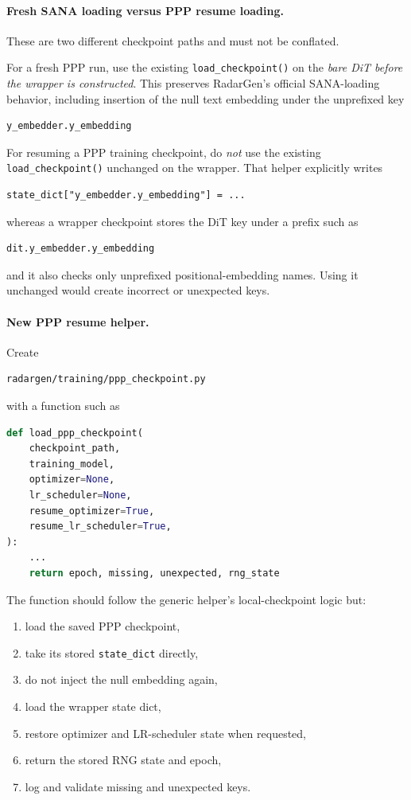 \documentclass[11pt,a4paper]{article}
\begin{document}
\paragraph{Fresh SANA loading versus PPP resume loading.}
These are two different checkpoint paths and must not be conflated.

For a fresh PPP run, use the existing \texttt{load\_checkpoint()} on the \emph{bare DiT before the wrapper is constructed}. This preserves RadarGen's official SANA-loading behavior, including insertion of the null text embedding under the unprefixed key
\begin{lstlisting}
y_embedder.y_embedding
\end{lstlisting}

For resuming a PPP training checkpoint, do \emph{not} use the existing \texttt{load\_checkpoint()} unchanged on the wrapper. That helper explicitly writes
\begin{lstlisting}
state_dict["y_embedder.y_embedding"] = ...
\end{lstlisting}
whereas a wrapper checkpoint stores the DiT key under a prefix such as
\begin{lstlisting}
dit.y_embedder.y_embedding
\end{lstlisting}
and it also checks only unprefixed positional-embedding names. Using it unchanged would create incorrect or unexpected keys.

\paragraph{New PPP resume helper.}
Create
\begin{lstlisting}
radargen/training/ppp_checkpoint.py
\end{lstlisting}
with a function such as
\begin{lstlisting}[language=Python]
def load_ppp_checkpoint(
    checkpoint_path,
    training_model,
    optimizer=None,
    lr_scheduler=None,
    resume_optimizer=True,
    resume_lr_scheduler=True,
):
    ...
    return epoch, missing, unexpected, rng_state
\end{lstlisting}

The function should follow the generic helper's local-checkpoint logic but:
\begin{enumerate}[label=\arabic*.]
    \item load the saved PPP checkpoint,
    \item take its stored \texttt{state\_dict} directly,
    \item do not inject the null embedding again,
    \item load the wrapper state dict,
    \item restore optimizer and LR-scheduler state when requested,
    \item return the stored RNG state and epoch,
    \item log and validate missing and unexpected keys.
\end{enumerate}
\end{document}

